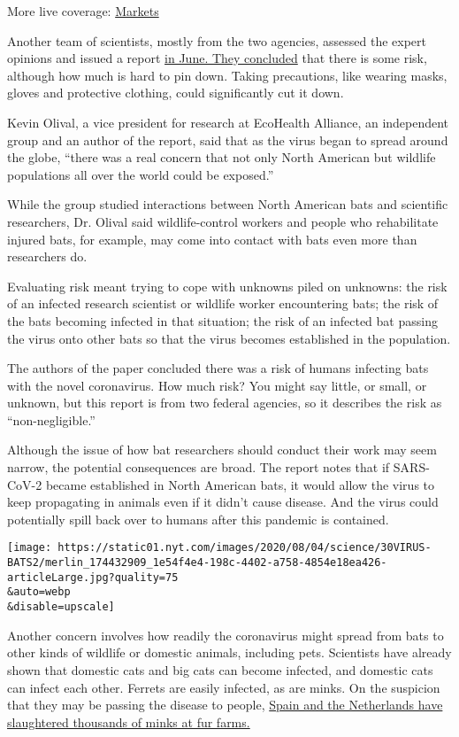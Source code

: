 More live coverage:
\href{https://www.nytimes.com/live/2020/07/31/business/stock-market-today-coronavirus?action=click\&pgtype=Article\&state=default\&region=MAIN_CONTENT_1\&context=storylines_live_updates}{Markets}

Another team of scientists, mostly from the two agencies, assessed the
expert opinions and issued a report
\href{https://doi.org/10.3133/ofr20201060}{in June. They concluded} that
there is some risk, although how much is hard to pin down. Taking
precautions, like wearing masks, gloves and protective clothing, could
significantly cut it down.

Kevin Olival, a vice president for research at EcoHealth Alliance, an
independent group and an author of the report, said that as the virus
began to spread around the globe, ``there was a real concern that not
only North American but wildlife populations all over the world could be
exposed.''

While the group studied interactions between North American bats and
scientific researchers, Dr. Olival said wildlife-control workers and
people who rehabilitate injured bats, for example, may come into contact
with bats even more than researchers do.

Evaluating risk meant trying to cope with unknowns piled on unknowns:
the risk of an infected research scientist or wildlife worker
encountering bats; the risk of the bats becoming infected in that
situation; the risk of an infected bat passing the virus onto other bats
so that the virus becomes established in the population.

The authors of the paper concluded there was a risk of humans infecting
bats with the novel coronavirus. How much risk? You might say little, or
small, or unknown, but this report is from two federal agencies, so it
describes the risk as ``non-negligible.''

Although the issue of how bat researchers should conduct their work may
seem narrow, the potential consequences are broad. The report notes that
if SARS-CoV-2 became established in North American bats, it would allow
the virus to keep propagating in animals even if it didn't cause
disease. And the virus could potentially spill back over to humans after
this pandemic is contained.

\texttt{[image: https://static01.nyt.com/images/2020/08/04/science/30VIRUS-BATS2/merlin\_174432909\_1e54f4e4-198c-4402-a758-4854e18ea426-articleLarge.jpg?quality=75\\\&auto=webp\\\&disable=upscale]}

Another concern involves how readily the coronavirus might spread from
bats to other kinds of wildlife or domestic animals, including pets.
Scientists have already shown that domestic cats and big cats can become
infected, and domestic cats can infect each other. Ferrets are easily
infected, as are minks. On the suspicion that they may be passing the
disease to people,
\href{https://www.nytimes.com/reuters/2020/07/16/world/europe/16reuters-health-coronavirus-spain-minks.html}{Spain
and the Netherlands have slaughtered thousands of minks at fur farms.}

